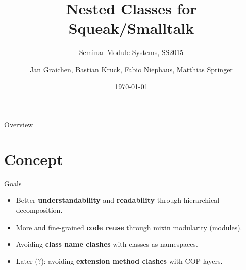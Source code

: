 \documentclass[xcolor=dvipsname, handout]{beamer} %
\title{Nested Classes for Squeak/Smalltalk}
\subtitle{Seminar Module Systems, SS2015}
\author{Jan Graichen, Bastian Kruck, Fabio Niephaus, Matthias Springer}
\date{\today}
\institute[2012]{Hasso Plattner Institute, Software Architecture Group}
\begin{document}
\begin{frame}[plain]
	\maketitle
\end{frame}
\begin{frame}{Overview}
	\tableofcontents[hideallsubsections]
\end{frame}


\section{Concept}
\begin{frame}{Goals}
  \begin{itemize}
    \item Better \textbf{understandability} and \textbf{readability} through hierarchical decomposition.
    \item More and fine-grained \textbf{code reuse} through mixin modularity (modules).
    \item Avoiding \textbf{class name clashes} with classes as namespaces.
    \item Later (?): avoiding \textbf{extension method clashes} with COP layers.
  \end{itemize}
\end{frame}
\end{document}
